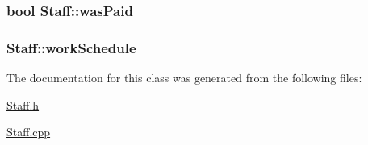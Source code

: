 \subsubsection[{\texorpdfstring{was\+Paid}{wasPaid}}]{\setlength{\rightskip}{0pt plus 5cm}bool Staff\+::was\+Paid\hspace{0.3cm}{\ttfamily [private]}}\hypertarget{classStaff_ae1f9f88528e62ba09e50966a46353208}{}\label{classStaff_ae1f9f88528e62ba09e50966a46353208}
\subsubsection[{\texorpdfstring{work\+Schedule}{workSchedule}}]{ Staff\+::work\+Schedule\hspace{0.3cm}{\ttfamily [private]}}\hypertarget{classStaff_ac2864b27c3cf1383c39916077b64b229}{}\label{classStaff_ac2864b27c3cf1383c39916077b64b229}


The documentation for this class was generated from the following files\+:\begin{DoxyCompactItemize}
\item 
\hyperlink{Staff_8h}{Staff.\+h}\item 
\hyperlink{Staff_8cpp}{Staff.\+cpp}\end{DoxyCompactItemize}
